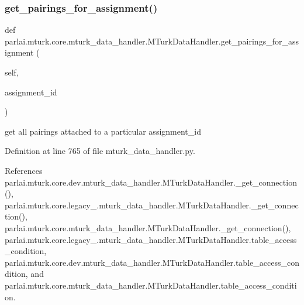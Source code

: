 \subsubsection{\texorpdfstring{get\+\_\+pairings\+\_\+for\+\_\+assignment()}{get\_pairings\_for\_assignment()}}
{\footnotesize\ttfamily def parlai.\+mturk.\+core.\+mturk\+\_\+data\+\_\+handler.\+M\+Turk\+Data\+Handler.\+get\+\_\+pairings\+\_\+for\+\_\+assignment (\begin{DoxyParamCaption}\item[{}]{self,  }\item[{}]{assignment\+\_\+id }\end{DoxyParamCaption})}

\begin{DoxyVerb}get all pairings attached to a particular assignment_id\end{DoxyVerb}
 

Definition at line 765 of file mturk\+\_\+data\+\_\+handler.\+py.



References parlai.\+mturk.\+core.\+dev.\+mturk\+\_\+data\+\_\+handler.\+M\+Turk\+Data\+Handler.\+\_\+get\+\_\+connection(), parlai.\+mturk.\+core.\+legacy\+\_.\+mturk\+\_\+data\+\_\+handler.\+M\+Turk\+Data\+Handler.\+\_\+get\+\_\+connection(), parlai.\+mturk.\+core.\+mturk\+\_\+data\+\_\+handler.\+M\+Turk\+Data\+Handler.\+\_\+get\+\_\+connection(), parlai.\+mturk.\+core.\+legacy\+\_.\+mturk\+\_\+data\+\_\+handler.\+M\+Turk\+Data\+Handler.\+table\+\_\+access\+\_\+condition, parlai.\+mturk.\+core.\+dev.\+mturk\+\_\+data\+\_\+handler.\+M\+Turk\+Data\+Handler.\+table\+\_\+access\+\_\+condition, and parlai.\+mturk.\+core.\+mturk\+\_\+data\+\_\+handler.\+M\+Turk\+Data\+Handler.\+table\+\_\+access\+\_\+condition.

